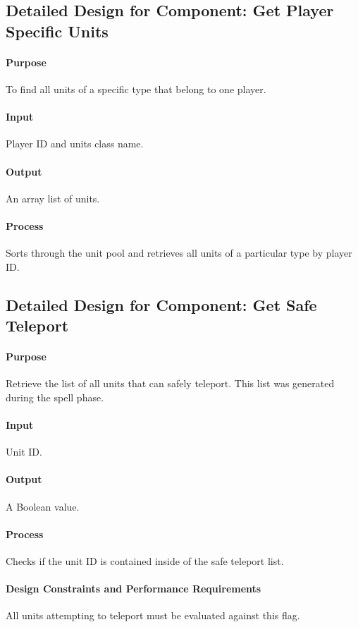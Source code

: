\documentclass[12pt,a4paper,titlepage]{article}
\begin{document}
\subsection{Detailed Design for Component: Get Player Specific Units}
\paragraph{Purpose} To find all units of a specific type that belong to one player.
\paragraph{Input} Player ID and units class name.
\paragraph{Output} An array list of units.
\paragraph{Process} Sorts through the unit pool and retrieves all units of a particular type by player ID.

\subsection{Detailed Design for Component: Get Safe Teleport}
\paragraph{Purpose} Retrieve the list of all units that can safely teleport. This list was generated during the spell phase.
\paragraph{Input} Unit ID.
\paragraph{Output} A Boolean value.
\paragraph{Process} Checks if the unit ID is contained inside of the safe teleport list.
\paragraph{Design Constraints and Performance Requirements} All units attempting to teleport must be evaluated against this flag.
\end{document}
